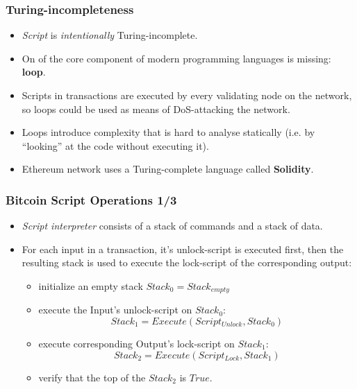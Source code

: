 \documentclass{beamer}
\begin{document}
\begin{frame}[fragile]
  \frametitle{Turing-incompleteness}
  \begin{itemize}
  \item \textit{Script} is \textit{intentionally} Turing-incomplete.
  \item On of the core component of modern programming languages is missing:
    \textbf{loop}.
  \item Scripts in transactions are executed by every validating node on the
    network, so loops could be used as means of DoS-attacking the network.
  \item Loops introduce complexity that is hard to analyse statically (i.e. by
    ``looking'' at the code without executing it).
  \item Ethereum network uses a Turing-complete language called
    \textbf{Solidity}.
  \end{itemize}
\end{frame}

\begin{frame}[fragile]
  \frametitle{Bitcoin Script Operations 1/3}
  \begin{itemize}
  \item \textit{Script interpreter} consists of a stack of commands and a stack
    of data.
  \item For each input in a transaction, it's unlock-script is executed first,
    then the resulting stack is used to execute the lock-script of the
    corresponding output:
    \begin{itemize}
    \item initialize an empty stack $Stack_0 = Stack_{empty}$
    \item execute the Input's unlock-script on $Stack_0$:
      $$Stack_1 = Execute(Script_{Unlock}, Stack_0)$$
    \item execute corresponding Output's lock-script on $Stack_1$:
      $$Stack_2 = Execute(Script_{Lock}, Stack_1)$$
    \item verify that the top of the $Stack_2$ is $True$.
    \end{itemize}
  \end{itemize}
\end{frame}
\end{document}
